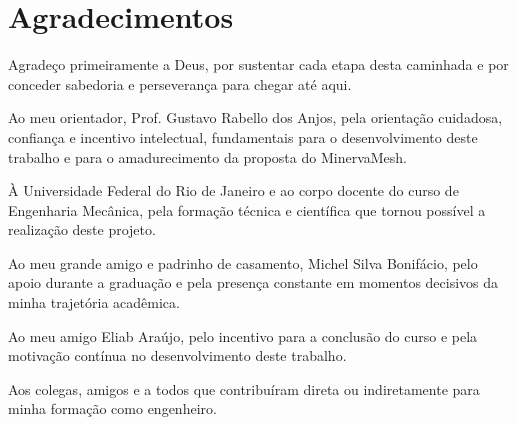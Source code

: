 \chapter*{Agradecimentos}

Agradeço primeiramente a Deus, por sustentar cada etapa desta caminhada e por conceder sabedoria e perseverança para chegar até aqui.

Ao meu orientador, Prof. Gustavo Rabello dos Anjos, pela orientação cuidadosa, confiança e incentivo intelectual, fundamentais para o desenvolvimento deste trabalho e para o amadurecimento da proposta do MinervaMesh.

À Universidade Federal do Rio de Janeiro e ao corpo docente do curso de Engenharia Mecânica, pela formação técnica e científica que tornou possível a realização deste projeto.

Ao meu grande amigo e padrinho de casamento, Michel Silva Bonifácio, pelo apoio durante a graduação e pela presença constante em momentos decisivos da minha trajetória acadêmica.

Ao meu amigo Eliab Araújo, pelo incentivo para a conclusão do curso e pela motivação contínua no desenvolvimento deste trabalho.

Aos colegas, amigos e a todos que contribuíram direta ou indiretamente para minha formação como engenheiro.
